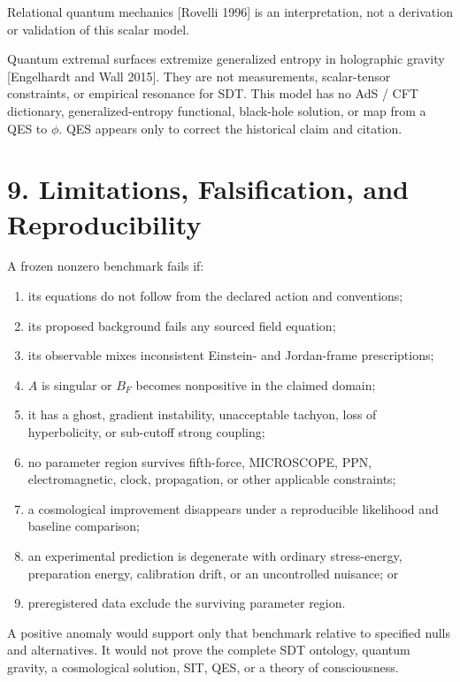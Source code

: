 \documentclass[
  american,
  11pt,
  letterpaper,
]{article}
\providecommand{\tightlist}{%
  \setlength{\itemsep}{0pt}\setlength{\parskip}{0pt}}
\begin{document}
Relational quantum mechanics {[}Rovelli 1996{]} is an interpretation, not a derivation or validation of this scalar model.

Quantum extremal surfaces extremize generalized entropy in holographic gravity {[}Engelhardt and Wall 2015{]}. They are not measurements, scalar-tensor constraints, or empirical resonance for SDT. This model has no AdS / CFT dictionary, generalized-entropy functional, black-hole solution, or map from a QES to \(\phi\). QES appears only to correct the historical claim and citation.

\section{9. Limitations, Falsification, and Reproducibility}\label{limitations-falsification-and-reproducibility}

A frozen nonzero benchmark fails if:

\begin{enumerate}
\def\labelenumi{\arabic{enumi}.}
\tightlist
\item
  its equations do not follow from the declared action and conventions;
\item
  its proposed background fails any sourced field equation;
\item
  its observable mixes inconsistent Einstein- and Jordan-frame prescriptions;
\item
  \(A\) is singular or \(B_F\) becomes nonpositive in the claimed domain;
\item
  it has a ghost, gradient instability, unacceptable tachyon, loss of hyperbolicity, or sub-cutoff strong coupling;
\item
  no parameter region survives fifth-force, MICROSCOPE, PPN, electromagnetic, clock, propagation, or other applicable constraints;
\item
  a cosmological improvement disappears under a reproducible likelihood and baseline comparison;
\item
  an experimental prediction is degenerate with ordinary stress-energy, preparation energy, calibration drift, or an uncontrolled nuisance; or
\item
  preregistered data exclude the surviving parameter region.
\end{enumerate}

A positive anomaly would support only that benchmark relative to specified nulls and alternatives. It would not prove the complete SDT ontology, quantum gravity, a cosmological solution, SIT, QES, or a theory of consciousness.
\end{document}
